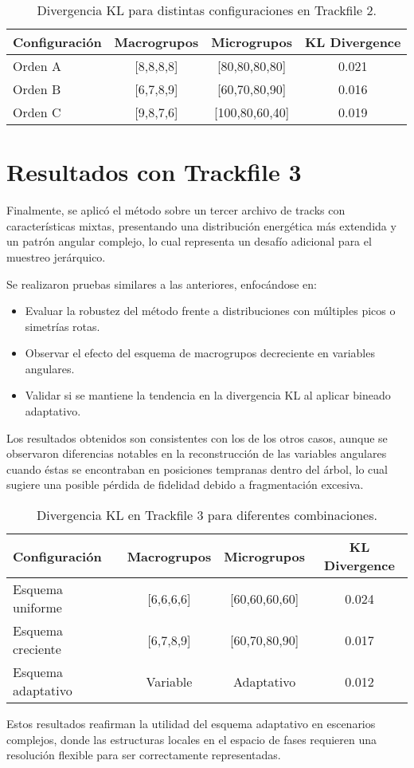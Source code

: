 \begin{table}[H]
    \centering
    \caption{Divergencia KL para distintas configuraciones en Trackfile 2.}
    \begin{tabular}{lccc}
        \toprule
        \textbf{Configuración} & \textbf{Macrogrupos} & \textbf{Microgrupos} & \textbf{KL Divergence} \\
        \midrule
        Orden A & [8,8,8,8] & [80,80,80,80] & 0.021 \\
        Orden B & [6,7,8,9] & [60,70,80,90] & 0.016 \\
        Orden C & [9,8,7,6] & [100,80,60,40] & 0.019 \\
        \bottomrule
    \end{tabular}
    \label{tab:trackfile2_kl}
\end{table}


\section{Resultados con Trackfile 3}
\label{sec:resultados-track3}

Finalmente, se aplicó el método sobre un tercer archivo de tracks con características mixtas, presentando una distribución energética más extendida y un patrón angular complejo, lo cual representa un desafío adicional para el muestreo jerárquico.

Se realizaron pruebas similares a las anteriores, enfocándose en:

\begin{itemize}
    \item Evaluar la robustez del método frente a distribuciones con múltiples picos o simetrías rotas.
    \item Observar el efecto del esquema de macrogrupos decreciente en variables angulares.
    \item Validar si se mantiene la tendencia en la divergencia KL al aplicar bineado adaptativo.
\end{itemize}

Los resultados obtenidos son consistentes con los de los otros casos, aunque se observaron diferencias notables en la reconstrucción de las variables angulares cuando éstas se encontraban en posiciones tempranas dentro del árbol, lo cual sugiere una posible pérdida de fidelidad debido a fragmentación excesiva.

\begin{table}[H]
    \centering
    \caption{Divergencia KL en Trackfile 3 para diferentes combinaciones.}
    \begin{tabular}{lccc}
        \toprule
        \textbf{Configuración} & \textbf{Macrogrupos} & \textbf{Microgrupos} & \textbf{KL Divergence} \\
        \midrule
        Esquema uniforme & [6,6,6,6] & [60,60,60,60] & 0.024 \\
        Esquema creciente & [6,7,8,9] & [60,70,80,90] & 0.017 \\
        Esquema adaptativo & Variable & Adaptativo & 0.012 \\
        \bottomrule
    \end{tabular}
    \label{tab:trackfile3_kl}
\end{table}

Estos resultados reafirman la utilidad del esquema adaptativo en escenarios complejos, donde las estructuras locales en el espacio de fases requieren una resolución flexible para ser correctamente representadas.


